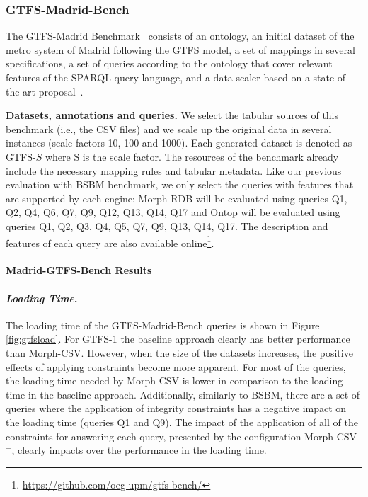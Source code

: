 \subsubsection{GTFS-Madrid-Bench}
The GTFS-Madrid Benchmark~\citep{chaves2020gtfs} consists of an ontology, an initial dataset of the metro system of Madrid following the GTFS model, a set of mappings in several specifications, a set of queries according to the ontology that cover relevant features of the SPARQL query language, and a data scaler based on a state of the art proposal~\citep{lanti2014npd}. 

\noindent\textbf{Datasets, annotations and queries.} We select the tabular sources of this benchmark (i.e., the CSV files) and we scale up the original data in several instances (scale factors 10, 100 and 1000). Each generated dataset is denoted as GTFS-$S$ where S is the scale factor. The resources of the benchmark already include the necessary mapping rules and tabular metadata. Like our previous evaluation with BSBM benchmark, we only select the queries with features that are supported by each engine: Morph-RDB will be evaluated using  queries Q1, Q2, Q4, Q6, Q7, Q9, Q12, Q13, Q14, Q17 and Ontop will be evaluated using  queries Q1, Q2, Q3, Q4, Q5, Q7, Q9, Q13, Q14, Q17. The description and features of each query are also available online\footnote{\url{https://github.com/oeg-upm/gtfs-bench/}}.

\noindent\paragraph*{\textbf{Madrid-GTFS-Bench Results}}

\noindent\paragraph*{\textit{Loading Time}.}
The loading time of the GTFS-Madrid-Bench queries is shown in Figure \ref{fig:gtfsload}. For GTFS-1 the baseline approach clearly has better performance than Morph-CSV. However, when the size of the datasets increases, the positive effects of applying constraints become more apparent. For most of the queries, the loading time needed by Morph-CSV is lower in comparison to the loading time in the baseline approach. Additionally, similarly to BSBM, there are a set of queries where the application of integrity constraints has a negative impact on the loading time (queries Q1 and Q9). The impact of the application of all of the constraints for answering each query, presented by the configuration Morph-CSV$^-$, clearly impacts over the performance in the loading time.

